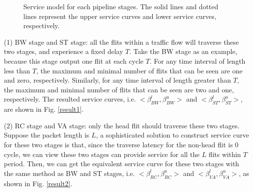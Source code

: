 \documentclass[10pt,journal]{IEEEtran}
\begin{document}
\begin{figure}
  \caption{Service model for each pipeline stages. The solid lines and dotted lines represent the upper service curves and lower service curves, respectively.}
\end{figure}

(1) BW stage and ST stage: all the flits within a traffic flow will traverse these two stages, and experience a fixed delay $T$. Take the BW stage as an example, because this stage output one flit at each cycle $T$. For any time interval of length less than $T$, the maximum and minimal number of flits that can be seen are one and zero, respectively. Similarly, for any time interval of length greater than $T$, the maximum and minimal number of flits that can be seen are two and one, respectively. The resulted service curves, i.e. $<\beta^l_{BW},\beta^u_{BW}>$ and $<\beta^l_{ST},\beta^u_{ST}>$, are shown in Fig. \ref{result1}.

(2) RC stage and VA stage: only the head flit should traverse these two stages. Suppose the packet length is $L$, a sophisticated solution to construct service curve for these two stages is that, since the traverse latency for the non-head flit is $0$ cycle, we can view these two stages can provide service for all the $L$ flits within $T$ period. Then, we can get the equivalent service curve for these two stages with the same method as BW and ST stages, i.e. $<\beta^l_{RC},\beta^u_{RC}>$ and $<\beta^l_{VA},\beta^u_{VA}>$, as shown in Fig. \ref{result2}.
\end{document}
